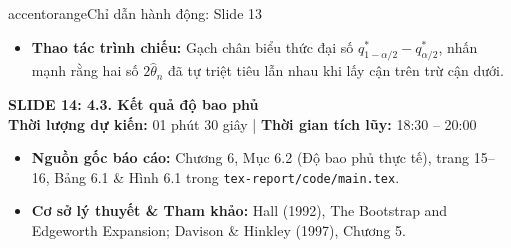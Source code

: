 \documentclass[10pt,a4paper]{article}
\newcommand{\slideheader}[4]{
    \vspace{0.4cm}
    \begin{tcolorbox}[colback=primary!7!white, colframe=primary, arc=2mm, boxrule=1pt, left=4mm, right=4mm, top=2.5mm, bottom=2.5mm]
        {\Large\bfseries\color{primary} SLIDE #1: #2}\\[0.1cm]
        {\small\textbf{Thời lượng dự kiến:} #3 \quad | \quad \textbf{Thời gian tích lũy:} #4}
    \end{tcolorbox}
    \vspace{0.15cm}
}
\begin{document}
\begin{actionbox}{accentorange}{Chỉ dẫn hành động: Slide 13}
    \begin{itemize}
        \item \textbf{Thao tác trình chiếu:} Gạch chân biểu thức đại số $q_{1-\alpha/2}^* - q_{\alpha/2}^*$, nhấn mạnh rằng hai số $2\hat\theta_n$ đã tự triệt tiêu lẫn nhau khi lấy cận trên trừ cận dưới.
    \end{itemize}
\end{actionbox}

\newpage

\slideheader{14}{4.3. Kết quả độ bao phủ}{01 phút 30 giây}{18:30 -- 20:00}

\begin{itemize}
    \item \textbf{Nguồn gốc báo cáo:} Chương 6, Mục 6.2 (Độ bao phủ thực tế), trang 15--16, Bảng 6.1 \& Hình 6.1 trong \texttt{tex-report/code/main.tex}.
    \item \textbf{Cơ sở lý thuyết \& Tham khảo:} Hall (1992), The Bootstrap and Edgeworth Expansion; Davison \& Hinkley (1997), Chương 5.
\end{itemize}
\end{document}
